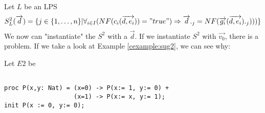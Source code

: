 \index{}\documentclass[a4paper,10pt]{article}
\theoremstyle{plain}
\theoremstyle{definition}
\newcommand{\ovr}{\overrightarrow}
\begin{document}
\begin{defn}\label{def:sug2}  Let $L$ be an LPS
\begin{displaymath}
S_L^2(\ovr{d})=
\lbrace
j \in \lbrace 1, \ldots , n \rbrace \vert \forall_{i\in I} (NF(c_i(\ovr{d,e_i})) = "true") \Rightarrow \ovr{d}._j = NF(\ovr{g_i}(\ovr{d,e_i})._j)))\rbrace
\end{displaymath}
We now can "instantiate" the $S^2$ with a $\ovr{d}$. If we instantiate $S^2$ with $\ovr{v_0}$, there is a problem. If we take a look at Example \ref{cexample:sug2}, we can see why:

\begin{example} Let $E2$ be\label{cexample:sug2}\begin{verbatim}

proc P(x,y: Nat) = (x=0) -> P(x:= 1, y:= 0) +
                   (x=1) -> P(x:= x, y:= 1);
init P(x := 0, y:= 0);


\end{verbatim}
\end{example}
\end{defn}
\end{document}
